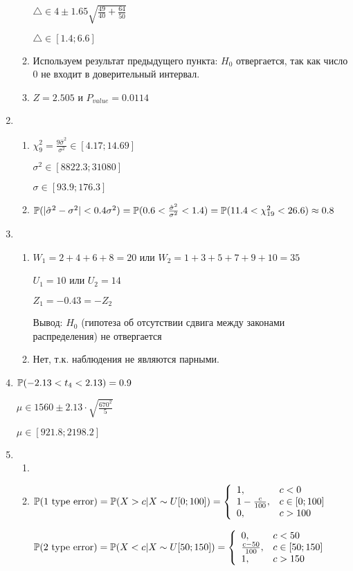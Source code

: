 \begin{enumerate}
\begin{enumerate}
$\triangle \in 4 \pm 1.65\sqrt{\frac{49}{40}+\frac{64}{50}}$

$\triangle \in [1.4;6.6]$
\item Используем результат предыдущего пункта: $H_{0}$ отвергается, так как число 0 не входит в доверительный интервал.
\item $Z=2.505$ и $P_{value}=0.0114$
\end{enumerate}
\item
\begin{enumerate}
\item $\chi_{9}^{2}=\frac{9\hat{\sigma}^{2}}{\sigma^{2}} \in [4.17; 14.69]$

$\sigma^{2} \in [8822.3; 31080]$

$\sigma \in [93.9; 176.3] $
\item  $\P(|\hat{\sigma}^{2}-\sigma^{2}|<0.4\sigma^{2})=\P(0.6<\frac{\hat{\sigma}^{2}}{\sigma^{2}}<1.4)=\P(11.4<\chi_{19}^{2}<26.6)\approx 0.8$
\end{enumerate}
\item
\begin{enumerate}
\item $W_{1}=2+4+6+8=20$ или $W_{2}=1+3+5+7+9+10=35$

$U_{1}=10$ или $U_{2}=14$

$Z_{1}=-0.43=-Z_{2}$

Вывод: $H_{0}$ (гипотеза об отсутствии сдвига между законами распределения) не отвергается
\item Нет, т.к. наблюдения не являются парными.
\end{enumerate}
\item  $\P(-2.13<t_{4}<2.13)=0.9$

$\mu \in 1560 \pm 2.13\cdot \sqrt{\frac{670^{2}}{5}}$

$\mu \in [921.8;2198.2]$
\item
\begin{enumerate}
\item
\item  $\P(\text{1 type error})=\P(X>c|X\sim U[0;100])= \left\{
\begin{array}{ll}
  1, & c<0 \\
  1-\frac{c}{100}, & c \in [0;100] \\
  0, & c>100 \\
\end{array}
\right.$

$\P(\text{2 type error})=\P(X<c|X\sim U[50;150])= \left\{
\begin{array}{ll}
  0, & c<50 \\
  \frac{c-50}{100}, & c \in [50;150] \\
  1, & c>150 \\
\end{array}
\right.$


\end{enumerate}
\end{enumerate}
